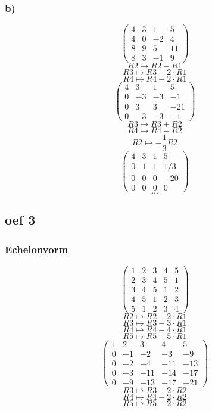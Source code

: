 \documentclass[lineaire_algebra_oplossingen.tex]{subfiles}
\begin{document}
\subsubsection*{b)}
\[
\begin{pmatrix}
4 & 3 & 1 & 5\\
4 & 0 & -2 & 4\\
8 & 9 & 5 & 11\\
8 & 3 & -1 & 9
\end{pmatrix}
\]
\[ R2 \longmapsto R2 - R1\]
\[ R3 \longmapsto R3 - 2\cdot R1\]
\[ R4 \longmapsto R4 - 2\cdot R1\]
\[
\begin{pmatrix}
4 & 3 & 1 & 5\\
0 & -3 & -3 & -1\\
0 & 3 & 3 & -21\\
0 & -3 & -3 & -1
\end{pmatrix}
\]
\[ R3 \longmapsto R3 + R2\]
\[ R4 \longmapsto R4 - R2\]
\[ R2 \longmapsto -\frac{1}{3}R2\]
\[
\begin{pmatrix}
4 & 3 & 1 & 5\\
0 & 1 & 1 & 1/3\\
0 & 0 & 0 & -20\\
0 & 0 & 0 & 0
\end{pmatrix}
\]
\[...\]

\subsection{oef 3}
\subsubsection*{Echelonvorm}
\[
\begin{pmatrix}
1 &  2 &  3 &  4 &  5\\
2 &  3 &  4 &  5 &  1\\
3 &  4 &  5 &  1 &  2\\
4 &  5 &  1 &  2 &  3\\
5 &  1 &  2 &  3 &  4 
\end{pmatrix}
\]
\[ R2 \longmapsto R2 -2\cdot R1\]
\[ R3 \longmapsto R3 -3\cdot R1\]
\[ R4 \longmapsto R4 -4\cdot R1\]
\[ R5 \longmapsto R5 -5\cdot R1\]
\[
\begin{pmatrix}
1 &  2 &  3 &  4 &  5 \\
0 & -1 & -2 & -3 & -9 \\
0 & -2 & -4 & -11& -13\\
0 & -3 & -11& -14& -17\\
0 & -9 & -13& -17& -21
\end{pmatrix}
\]
\[ R3 \longmapsto R3 -2\cdot R2\]
\[ R4 \longmapsto R4 -2\cdot R2\]
\[ R5 \longmapsto R5 -2\cdot R2\]
\end{document}
